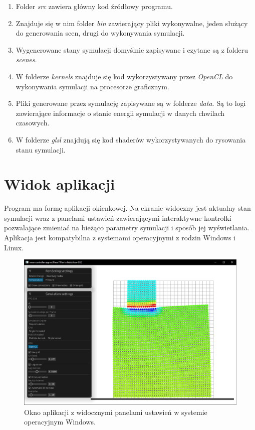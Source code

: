 \documentclass[12pt, letterpaper]{report}
\begin{document}
    \begin{enumerate}
        \item Folder \emph{src} zawiera główny kod źródłowy programu.
        
        \item Znajduje się w nim folder \emph{bin} zawierający pliki wykonywalne, 
        jeden służący do generowania scen, drugi do wykonywania symulacji. 

        \item Wygenerowane stany symulacji domyślnie zapisywane i czytane są z folderu \emph{scenes}.
        
        \item W folderze \emph{kernels} znajduje się kod wykorzystywany przez \emph{OpenCL} do 
        wykonywania symulacji na procesorze graficznym.
        
        \item Pliki generowane przez symulację zapisywane są w folderze \emph{data}. 
        Są to logi zawierające informacje o stanie energii symulacji w danych chwilach czasowych.

        \item W folderze \emph{glsl} znajdują się kod shaderów wykorzystywanych do rysowania stanu symulacji.
    \end{enumerate}

    \newpage
    \section{Widok aplikacji}
    Program ma formę aplikacji okienkowej. Na ekranie widoczny jest aktualny stan symulacji wraz z 
    panelami ustawień zawierającymi interaktywne kontrolki pozwalające zmieniać na 
    bieżąco parametry symulacji i sposób jej wyświetlania. Aplikacja jest kompatybilna z
    systemami operacyjnymi z rodzin Windows i Linux.

    \begin{figure}[H]
        \centering
        \includegraphics[width=17cm]{app_view_full.png}
        \caption{
            Okno aplikacji z widocznymi panelami ustawień
            w systemie operacyjnym Windows.
        }
    \end{figure}
    
\end{document}
